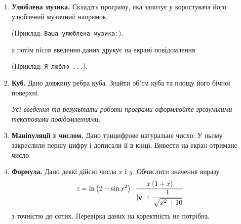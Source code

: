 
\begin{enumerate}

\item \textbf{Улюблена музика.} Складіть програму, яка запитує у користувача його улюблений музичний напрямок

(Приклад: \verb|Ваша улюблена музика:|),

а потім після введення даних друкує на екрані повідомлення

(Приклад: \verb|Я люблю ...|).

\item \textbf{Куб.} Дано довжину ребра куба. Знайти об'єм куба та площу його бічної поверхні.

{\itshape Усі введення та результати роботи програми оформлюйте зрозумілими текстовими повідомленнями.}

\item \textbf{Маніпуляції з числом.} Дано трицифрове натуральне число. У ньому закреслили першу цифру і дописали її в кінці. Вивести на екран отримане число.

\item \textbf{Формула.} Дано деякі дійсні числа $x$ і $y$. Обчислити значення виразу
$$
z=\ln \left(2-\sin x^2\right)\cdot\dfrac{x\,(1+x)}{|y|+\dfrac{1}{\sqrt{\mathstrut \mathstrut x^2+10}}}
$$
з точністю до сотих. Перевірка даних на коректність не потрібна.
\end{enumerate}




